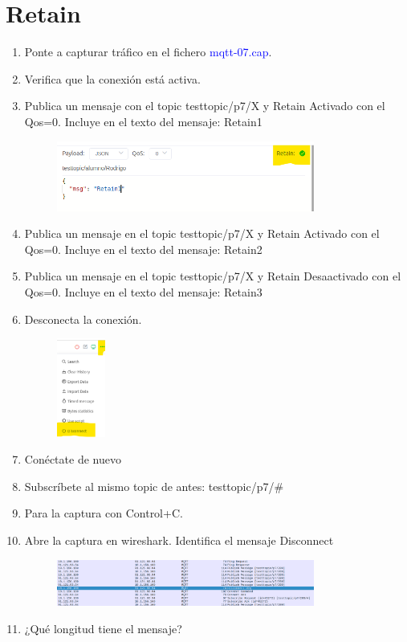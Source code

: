 \documentclass[12pt, a4paper]{report}
\begin{document}
\chapter{Retain}
\begin{enumerate}
	\item Ponte a capturar tráfico en el fichero \textcolor{blue}{mqtt-07.cap}.
	\item Verifica que la conexión está activa.
	\item Publica un mensaje con el topic testtopic/p7/X y Retain Activado con el Qos=0. Incluye en el
	texto del mensaje: Retain1
	\begin{figure}[H]
		\centering
		\includegraphics[width=0.8\textwidth]{enun17}
	\end{figure}
	\item Publica un mensaje en el topic testtopic/p7/X y Retain Activado con el Qos=0. Incluye en el
	texto del mensaje: Retain2
	\item Publica un mensaje en el topic testtopic/p7/X y Retain Desaactivado con el Qos=0. Incluye
	en el texto del mensaje: Retain3
	\item Desconecta la conexión.
	\begin{figure}[H]
		\centering
		\includegraphics[width=0.15\textwidth]{enun18}
	\end{figure}
	\item Conéctate de nuevo
	\item Subscríbete al mismo topic de antes: testtopic/p7/\#
	\item Para la captura con Control+C.
	\item Abre la captura en wireshark. Identifica el mensaje Disconnect
	\begin{figure}[H]
		\centering
		\includegraphics[width=0.8\textwidth]{ej9.10}
	\end{figure}
	\item ¿Qué longitud tiene el mensaje?\\
	

\end{enumerate}
\end{document}
